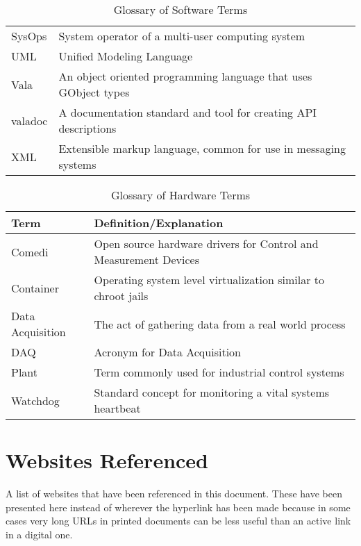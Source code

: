 \documentclass[11pt]{article}
\begin{document}
\begin{table}[H]
\begin{tabular}{l p{12cm}}
        SysOps & System operator of a multi-user computing system \\
        UML & Unified Modeling Language \\
        Vala & An object oriented programming language that uses GObject types \\
        valadoc & A documentation standard and tool for creating API descriptions \\
        XML & Extensible markup language, common for use in messaging systems \\
        \bottomrule
      \end{tabular}
      \caption{Glossary of Software Terms}\label{tab:gloss:sw}
    \end{table}

    \begin{table}[H]
      \centering
      \begin{tabular}{l p{12cm}}
        \toprule
        Term & Definition/Explanation \\ [0.5ex]
        \midrule
        Comedi & Open source hardware drivers for Control and Measurement Devices \\
        Container & Operating system level virtualization similar to chroot jails \\
        Data Acquisition & The act of gathering data from a real world process \\
        DAQ & Acronym for Data Acquisition \\
        Plant & Term commonly used for industrial control systems \\
        Watchdog & Standard concept for monitoring a vital systems heartbeat \\
        \bottomrule
      \end{tabular}
      \caption{Glossary of Hardware Terms}\label{tab:gloss:hw}
    \end{table}

  \newpage

  \section{Websites Referenced}\label{app:websites}

    A list of websites that have been referenced in this document. These have
    been presented here instead of wherever the hyperlink has been made
    because in some cases very long URLs in printed documents can be less useful
    than an active link in a digital one.
\end{document}
